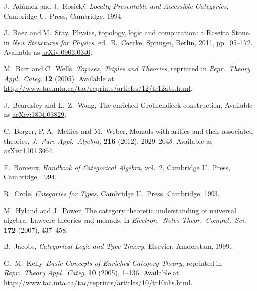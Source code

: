 \documentclass{amsart}
\theoremstyle{definition}
\begin{document}
\begin{thebibliography}{100}

 J.\ Ad\'{a}mek and J.\ Rosick\'{y}, \textsl{Locally Presentable and Accessible Categories}, Cambridge U.\ Press, Cambridge, 1994.

 J.\ Baez and M.\ Stay, Physics, topology, logic and computation: a Rosetta Stone, in \textsl{New Structures for Physics}, ed.\ B.\ Coecke, Springer, Berlin, 2011, pp.\ 95--172.  Available as \href{https://arxiv.org/abs/0903.0340}{arXiv:0903.0340}.
	
 M.\ Barr and C.\ Wells, \textsl{Toposes, Triples and Theories}, reprinted in \textsl{Repr.\ Theory Appl.\ Categ.} \textbf{12} (2005).   Available at \href{http://www.tac.mta.ca/tac/reprints/articles/12/tr12abs.html}{http://www.tac.mta.ca/tac/reprints/articles/12/tr12abs.html}.

 J.\ Beardsley and L.\ Z.\ Wong, The enriched Grothendieck construction.  Available as \href{https://arxiv.org/abs/1804.03829}{arXiv:1804.03829}.
	
 C.\ Berger, P.-A.\ Melli\`es and M.\ Weber, Monads with arities and their associated theories, \textsl{J.\ Pure Appl.\ Algebra}, \textbf{216} (2012), 2029--2048.  Available as \href{https://arxiv.org/abs/1101.3064}{arXiv:1101.3064}.

 F.\ Borceux, \textsl{Handbook of Categorical Algebra}, vol.\ 2, Cambridge U.\ Press, Cambridge, 1994.


 R.\ Crole, \textsl{Categories for Types}, Cambridge U.\ Press, Cambridge, 1993.

 M.\ Hyland and J.\ Power, The category theoretic understanding of 
universal algebra: Lawvere theories and monads, in \textsl{Electron.\ Notes Theor.\ Comput.\ 
Sci.} \textbf{172} (2007), 437--458.

 B.\ Jacobs, \textsl{Categorical Logic and Type Theory}, Elsevier, Amderstam, 1999.
	
 G.\ M.\ Kelly, \textsl{Basic Concepts of Enriched Category Theory}, reprinted in
\textsl{Repr.\ Theory Appl.\ Categ.} \textbf{10} (2005), 1--136.  Available at \href{http://www.tac.mta.ca/tac/reprints/articles/10/tr10abs.html}{http://www.tac.mta.ca/tac/reprints/articles/10/tr10abs.html}.


\end{thebibliography}
\end{document}
